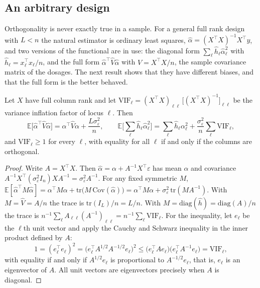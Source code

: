 \subsection{An arbitrary design}

Orthogonality is never exactly true in a sample. For a general full rank design with $L < n$ the natural estimator is ordinary least squares, $\hat\alpha = (X^\top X)^{-1}X^\top y$, and two versions of the functional are in use: the diagonal form $\sum_\ell \hat h_\ell\hat\alpha_\ell^2$ with $\hat h_\ell = x_\ell^\top x_\ell/n$, and the full form $\hat\alpha^\top\hat V\hat\alpha$ with $\hat V = X^\top X/n$, the sample covariance matrix of the dosages. The next result shows that they have different biases, and that the full form is the better behaved.

\begin{proposition}
\label{hs:prop:biasols}
Let $X$ have full column rank and let $\mathrm{VIF}_\ell = (X^\top X)_{\ell\ell}\,\big[(X^\top X)^{-1}\big]_{\ell\ell}$ be the variance inflation factor of locus $\ell$. Then
\[
\mathbb{E}\big[\hat\alpha^\top\hat V\hat\alpha\big] = \alpha^\top\hat V\alpha + \frac{L\sigma^2_\varepsilon}{n},
\qquad
\mathbb{E}\Big[\sum_\ell \hat h_\ell\hat\alpha_\ell^2\Big] = \sum_\ell\hat h_\ell\alpha_\ell^2 + \frac{\sigma^2_\varepsilon}{n}\sum_\ell \mathrm{VIF}_\ell ,
\]
and $\mathrm{VIF}_\ell \ge 1$ for every $\ell$, with equality for all $\ell$ if and only if the columns are orthogonal.
\end{proposition}

\begin{proof}
Write $A = X^\top X$. Then $\hat\alpha = \alpha + A^{-1}X^\top\varepsilon$ has mean $\alpha$ and covariance $A^{-1}X^\top(\sigma^2_\varepsilon I_n)XA^{-1} = \sigma^2_\varepsilon A^{-1}$. For any fixed symmetric $M$, $\mathbb{E}[\hat\alpha^\top M\hat\alpha] = \alpha^\top M\alpha + \mathrm{tr}\big(M\,\mathrm{Cov}(\hat\alpha)\big) = \alpha^\top M\alpha + \sigma^2_\varepsilon\,\mathrm{tr}(MA^{-1})$. With $M = \hat V = A/n$ the trace is $\mathrm{tr}(I_L)/n = L/n$. With $M = \mathrm{diag}(\hat h) = \mathrm{diag}(A)/n$ the trace is $n^{-1}\sum_\ell A_{\ell\ell}(A^{-1})_{\ell\ell} = n^{-1}\sum_\ell\mathrm{VIF}_\ell$. For the inequality, let $e_\ell$ be the $\ell$th unit vector and apply the Cauchy and Schwarz inequality in the inner product defined by $A$:
\[
1 = (e_\ell^\top e_\ell)^2 = \big(e_\ell^\top A^{1/2}A^{-1/2}e_\ell\big)^2 \le \big(e_\ell^\top Ae_\ell\big)\big(e_\ell^\top A^{-1}e_\ell\big) = \mathrm{VIF}_\ell,
\]
with equality if and only if $A^{1/2}e_\ell$ is proportional to $A^{-1/2}e_\ell$, that is, $e_\ell$ is an eigenvector of $A$. All unit vectors are eigenvectors precisely when $A$ is diagonal.
\end{proof}

